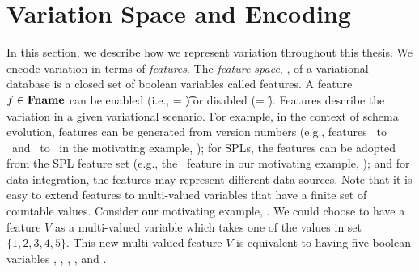 \section{Variation Space and Encoding}
\label{sec:encode-var}



In this section, we describe how we represent variation throughout this 
thesis. 
We encode variation in terms of \emph{features}.
%
The \emph{feature space}, \fSet, of a variational database
is a closed set of boolean variables called features.
%
A feature \ensuremath{\fName \in \fSet} can be enabled (i.e., \fName = \t) or disabled (\fName = \f).
Features describe the variation in a given variational scenario.
%
%
For example, in the context of schema evolution, features can be generated from version 
numbers (e.g., features \vOne\ to \vFive\ and \tOne\ to \tFive\ in the 
motivating example, ); for SPLs, 
the features can be adopted from the SPL feature set (e.g., the \edu\ feature in
our motivating example, ); and 
for data integration, the features may represent different data sources.  
Note that it is easy to extend features
to multi-valued variables that have a finite set of countable values.
Consider our motivating example, . We could choose to have a feature $V$
as a multi-valued variable which takes one of the values in set $\{1, 2, 3, 4, 5\}$. 
This new multi-valued feature $V$ is equivalent to having five boolean variables 
\vOne, \vTwo, \vThree, \vFour, and \vFive. 

